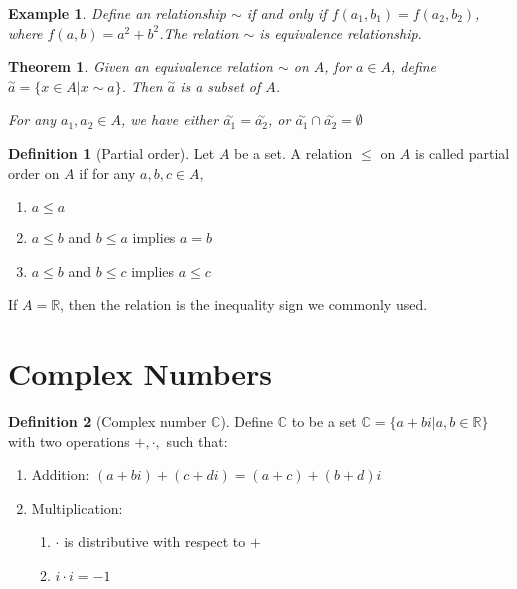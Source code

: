 \documentclass{article}
\theoremstyle{MyNonumberplain}
\theoremstyle{break}
\newcommand{\R}{\mathbb{R}}
\newcommand{\C}{\mathbb{C}}
\theoremstyle{break}
\newtheorem{theorem}{Theorem}[section]
\newtheorem{example}{Example}[section]
\theoremstyle{break}
\theoremstyle{definition}
\theoremstyle{break}
\newtheorem{definition}{Definition}[section]
\begin{document}
\begin{expbox}
    \begin{example}
        Define an relationship $\sim$ if and only if $f (a_1, b_1) = f (a_2, b_2)$, where $f (a, b) = a^2 + b^2$.\bigskip The relation $\sim$ is equivalence relationship.
    \end{example}
\end{expbox}

\begin{thmbox}
    \begin{theorem}
        Given an equivalence relation $\sim$ on $A$, for $a \in A$, define
        $\overset{\sim}{a} \overset{}{} = \{ x \in A|x \sim a \}$. Then
        $\overset{\sim}{a}$ is a subset of $A$.\bigskip

        For any $a_1, a_2 \in A$, we have either $\overset{\sim}{a_1} = \overset{\sim}{a_2}$,
        or $\overset{\sim}{a_1} \cap \overset{\sim}{a_2} = \emptyset$
    \end{theorem}
\end{thmbox}

\begin{defbox}
    \begin{definition}[Partial order]
        Let $A$ be a set. A relation $\leq$ on $A$ is called partial order on $A$ if for any $a,b,c\in A$,\bigskip
        \begin{enumerate}
            \item $a \leq a$\bigskip
            \item $a \leq b$ and $b \leq a$ implies $a=b$\bigskip
            \item $a \leq b$ and $b \leq c$ implies $a \leq c$
        \end{enumerate}
    \end{definition}
\end{defbox}

If $A=\R$, then the relation is the inequality sign we commonly used.

\newpage

\section{Complex Numbers}

\begin{defbox}
    \begin{definition}[Complex number $\C$]
        Define $\C$ to be a set $\C=\{a+bi|a,b\in\R\}$ with two operations $+,\cdot,$ such that:\bigskip
        \begin{enumerate}
            \item Addition: $(a+bi)+(c+di)=(a+c)+(b+d)i$\bigskip
            \item Multiplication:\bigskip
            \begin{enumerate}
                \item $\cdot$ is distributive with respect to $+$\bigskip
                \item $i\cdot i=-1$
            \end{enumerate}
        \end{enumerate}
    \end{definition}
\end{defbox}
\end{document}
